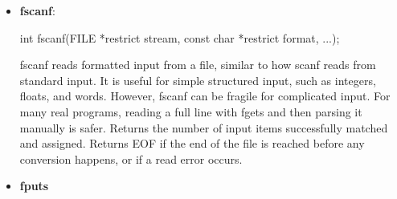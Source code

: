 \documentclass{report}
\begin{document}
\begin{itemize}
\begin{cppcode}
{                    fclose(fp);
                    return 0;
                }
            \end{cppcode}
            \bigbreak \noindent 
            This is the normal way to read a text file line by line in C.
        \item \textbf{fscanf}: 
            \bigbreak \noindent 
            \begin{cppcode}
                int fscanf(FILE *restrict stream, const char *restrict format, ...);
            \end{cppcode}
            \bigbreak \noindent 
            fscanf reads formatted input from a file, similar to how scanf reads from standard input.
            \bigbreak \noindent 
            It is useful for simple structured input, such as integers, floats, and words.
            \bigbreak \noindent 
            However, fscanf can be fragile for complicated input. For many real programs, reading a full line with fgets and then parsing it manually is safer.
            \bigbreak \noindent 
            Returns the number of input items successfully matched and assigned.
            \bigbreak \noindent 
            Returns EOF if the end of the file is reached before any conversion happens, or if a read error occurs.
        \item \textbf{fputs}


    \end{itemize}

    \pagebreak 
\end{document}
